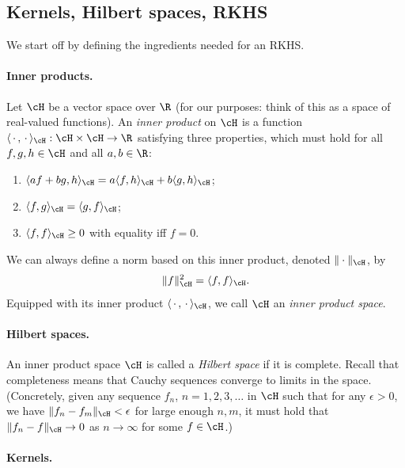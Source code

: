 \documentclass{article}
\begin{document}
\subsection{Kernels, Hilbert spaces, RKHS}

We start off by defining the ingredients needed for an RKHS. 

\paragraph{Inner products.}

Let $\cH$ be a vector space over $\R$ (for our purposes: think of this as a
space of real-valued functions). An \emph{inner product} on $\cH$ is a function
$\langle \,\cdot\,, \,\cdot\, \rangle_\cH : \cH \times \cH \to \R$ satisfying
three properties, which must hold for all $f,g,h \in \cH$ and all $a,b \in \R$: 
\begin{enumerate}
\item $\langle af + bg, h \rangle_\cH = a \langle f,h \rangle_\cH + b \langle
  g,h \rangle_\cH$;
\item $\langle f,g \rangle_\cH = \langle g,f \rangle_\cH$;
\item $\langle f,f \rangle_\cH \geq 0$ with equality iff $f=0$. 
\end{enumerate}
We can always define a norm based on this inner product, denoted
$\|\cdot\|_\cH$, by 
\[
\|f\|_\cH^2 = \langle f, f \rangle_\cH.
\]
Equipped with its inner product $\langle \,\cdot\,, \,\cdot\, \rangle_\cH$, we
call $\cH$ an \emph{inner product space}. 

\paragraph{Hilbert spaces.} 

An inner product space $\cH$ is called a \emph{Hilbert space} if it is
complete. Recall that completeness means that Cauchy sequences converge to   
limits in the space. (Concretely, given any sequence $f_n$, $n=1,2,3,\dots$ in
$\cH$ such that for any $\epsilon>0$, we have $\|f_n - f_m\|_\cH < \epsilon$ for
large enough $n,m$, it must hold that $\|f_n - f\|_\cH \to 0$ as $n \to \infty$
for some $f \in \cH$.)

\paragraph{Kernels.}
\end{document}
